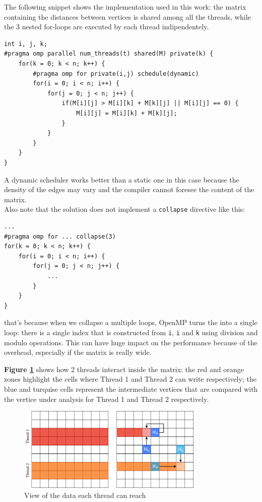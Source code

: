 The following snippet shows the implementation used in this work: the matrix containing the
distances between vertices is shared among all the threads, while the 3 nested for-loops are executed
by each thread indipendentely.



\begin{lstlisting}[style=CStyle]
int i, j, k;
#pragma omp parallel num_threads(t) shared(M) private(k) {
	for(k = 0; k < n; k++) {
		#pragma omp for private(i,j) schedule(dynamic)			
		for(i = 0; i < n; i++) {
			for(j = 0; j < n; j++) {
				if(M[i][j] > M[i][k] + M[k][j] || M[i][j] == 0) {
					M[i][j] = M[i][k] + M[k][j];
				}
			}
		}
	}
}
\end{lstlisting}

A dynamic scheduler works better than a static one in this case because the
density of the edges may vary and the compiler cannot foresee the content of the matrix. \\
Also note that the solution does not implement a \texttt{collapse} directive like this:
\begin{lstlisting}[style=CStyle]
...
#pragma omp for ... collapse(3)
for(k = 0; k < n; k++) {			
	for(i = 0; i < n; i++) {
		for(j = 0; j < n; j++) {
			...
		}
	}
}
\end{lstlisting}
that's because when we collapse a multiple loops, OpenMP turns the into a single loop: there is a single
index that is constructed from \texttt{i}, \texttt{i} and \texttt{k} using division and modulo operations. This can
have huge impact on the performance because of the overhead, especially if the matrix is really wide.

\textbf{Figure \ref*{fig:threads}} shows how 2 threads interact inside the matrix: the red and orange zones highlight the cells where
Thread 1 and Thread 2 can write respectively; the blue and turquise cells represent the intermediate vertices that are compared
with the vertice under analysis for Thread 1 and Thread 2 respectively.

\begin{figure}[h!]
\centering                                                                        
\includegraphics[width=3.5in]{diagrams/openmp-threads}
\captionsetup{justification=centering,margin=2cm}                                                                                                                                   
\caption{View of the data each thread can reach}                                                                                                                                            
\label{fig:threads}                                                                                                                                                           
\end{figure}

